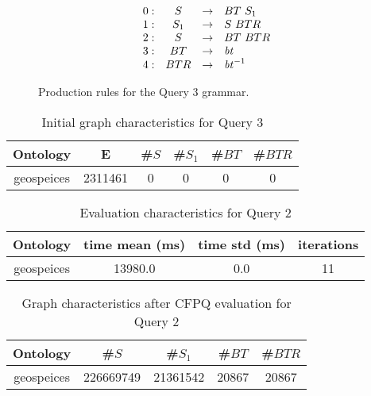\begin{figure}[h]
	\[
	\begin{array}{rccl}
	0: & S & \rightarrow & BT \ S_1 \\
	1: & S_1 & \rightarrow & S \ BTR \\
	2: & S & \rightarrow & BT \ BTR \\	 
	3: & BT & \rightarrow & \text{\emph{bt}} \\
	4: & BTR & \rightarrow & \text{\emph{bt}}^{-1} \\
	\end{array}
	\]
	\caption{Production rules for the Query 3 grammar.}
	\label{ProductionRulesQuery3}
\end{figure}

\begin{table*}[ht]
	\centering
	\caption{Initial graph characteristics for Query 3}
	\label{tbl7}
	
	\begin{tabular}{ | c | c | c | c | c | c |}
		\hline
		Ontology & E & \#$S$ & \#$S_1$ & \#$BT$ & \#$BTR$\\
		\hline 
		\hline
		geospeices        & 2311461 & 0 & 0 & 0 & 0\\
		\hline
	\end{tabular}
	
\end{table*}

\begin{table*}[ht]
	\centering
	\caption{Evaluation characteristics for Query 2}
	\label{tbl8}
	
	\begin{tabular}{ | c | c | c | c |}
		\hline
		Ontology & time mean (ms) & time std (ms) & iterations \\
		\hline 
		\hline
		geospeices        & 13980.0 & 0.0 & 11\\
		\hline
	\end{tabular}
	
\end{table*}

\begin{table*}[ht]
	\centering
	\caption{Graph characteristics after CFPQ evaluation for Query 2}
	\label{tbl9}
	
	\begin{tabular}{ | c | c | c | c | c |}
		\hline
		Ontology & \#$S$ & \#$S_1$ & \#$BT$ & \#$BTR$\\
		\hline 
		\hline
		geospeices        & 226669749 & 21361542 & 20867 & 20867\\
		\hline
	\end{tabular}
	
\end{table*}

